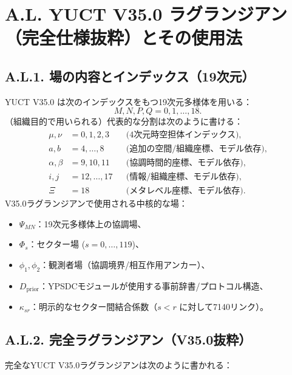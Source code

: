\documentclass[13pt,a4paper]{ltjsarticle}
\newcommand{\Dprior}{D_{\mathrm{prior}}}
\begin{document}
	\section*{A.L. YUCT V35.0 ラグランジアン（完全仕様抜粋）とその使用法}
	
	\subsection*{A.L.1. 場の内容とインデックス（19次元）}
	YUCT V35.0 は次のインデックスをもつ19次元多様体を用いる：
	\[
	M,N,P,Q=0,1,\dots,18.
	\]
	（組織目的で用いられる）代表的な分割は次のように書ける：
	\begin{align*}
		\mu,\nu &= 0,1,2,3 &&\text{(4次元時空担体インデックス)},\\
		a,b &= 4,\dots,8 &&\text{(追加の空間/組織座標、モデル依存)},\\
		\alpha,\beta &= 9,10,11 &&\text{(協調時間的座標、モデル依存)},\\
		i,j &= 12,\dots,17 &&\text{(情報/組織座標、モデル依存)},\\
		\Xi &= 18 &&\text{(メタレベル座標、モデル依存)}.
	\end{align*}
	V35.0ラグランジアンで使用される中核的な場：
	\begin{itemize}[leftmargin=*]
		\item $\Psi_{MN}$：19次元多様体上の協調場、
		\item $\Phi_s$：セクター場 ($s=0,\dots,119$)、
		\item $\phi_1,\phi_2$：観測者場（協調境界/相互作用アンカー）、
		\item $\Dprior$：YPSDCモジュールが使用する事前辞書/プロトコル構造、
		\item $\kappa_{sr}$：明示的なセクター間結合係数（$s<r$ に対して7140リンク）。
	\end{itemize}
	
	\subsection*{A.L.2. 完全ラグランジアン（V35.0抜粋）}
	完全なYUCT V35.0ラグランジアンは次のように書かれる：
	
\end{document}
